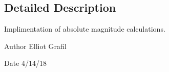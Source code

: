\subsection{Detailed Description}
Implimentation of absolute magnitude calculations. 

\begin{DoxyAuthor}{Author}
Elliot Grafil 
\end{DoxyAuthor}
\begin{DoxyDate}{Date}
4/14/18 
\end{DoxyDate}

